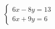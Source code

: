 \documentclass[preview]{standalone}
\begin{document}
\begin{align*}
\left\{ \begin{array}{rcl} 6x - 8y = 13 \\ 6x + 9y = 6 \end{array} \right.
\end{align*}
\end{document}
